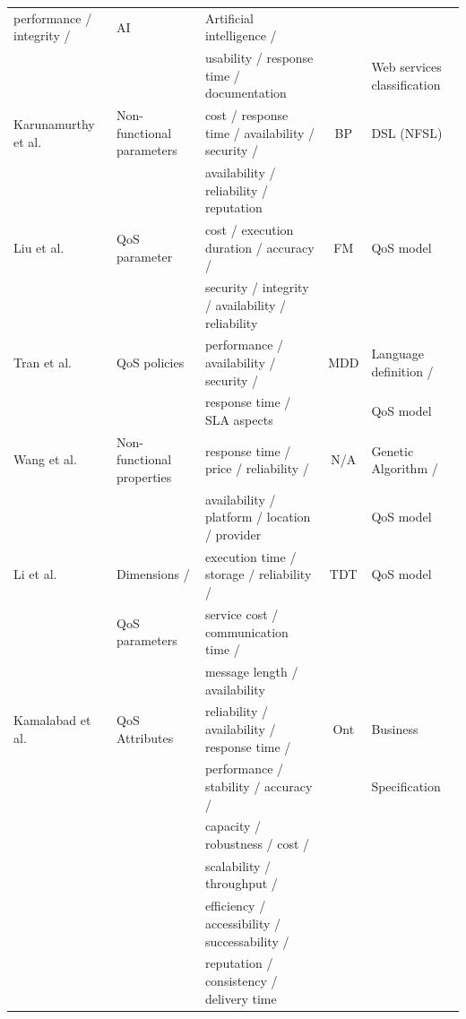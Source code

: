 \documentclass[english,12pt]{article}
\begin{document}
\begin{table}[ht!]
\begin{tabular}{l|l|l|c|l}
  performance / integrity / & AI & Artificial intelligence /\\ 
  &  &  usability / response time / documentation &   & Web services classification	 \\
  \hline  
   Karunamurthy et al. \cite{Karunamurthy2012787} & Non-functional parameters &
   cost / response time / availability /  security /   & BP &  DSL (NFSL)
\\
   &  & availability / reliability / reputation   &  & 
  \\  
  \hline  
   Liu et al. \cite{Liu20121080} & QoS parameter &
   cost / execution duration / accuracy /  & FM  &  QoS model
\\
   &  &  security / integrity / availability / reliability   &   & 
  \\
  \hline 
 
   Tran et al. \cite{Tran2012531} & QoS policies &
   performance / availability / security /  & MDD  &  Language definition /
\\
   &  &  response time /  SLA aspects  &   &  QoS model
  \\  
  \hline   

 
   Wang et al. \cite{Wang2012} & Non-functional properties &
   response time / price / reliability /   & N/A  &  Genetic Algorithm /
\\
   &  & availability / platform / location / provider   &   &  QoS model
  \\  
  \hline  
  
     Li et al. \cite{Li2013} & Dimensions / &
  execution time / storage / reliability /  & TDT  &   QoS model
\\
   & QoS parameters & service cost / communication time /    &   &  
  \\
  
   &  & message length / availability    &  & 
  \\  
  \hline   
   
      Kamalabad et al. \cite{Kamalabad2012} & QoS Attributes &
   reliability / availability / response time /   & Ont  &  Business
   
\\
   &  & performance / stability / accuracy /    &   &  Specification
  \\
  
   &  & capacity / robustness / cost /   &  & 
  \\
  &  & scalability / throughput /   &  &
  \\
  &  & efficiency / accessibility / successability /   &  & 
  \\
  &  & reputation / consistency / delivery time    &  & 
  \\  
  \hline  


\end{tabular}
\end{table}
\end{document}
